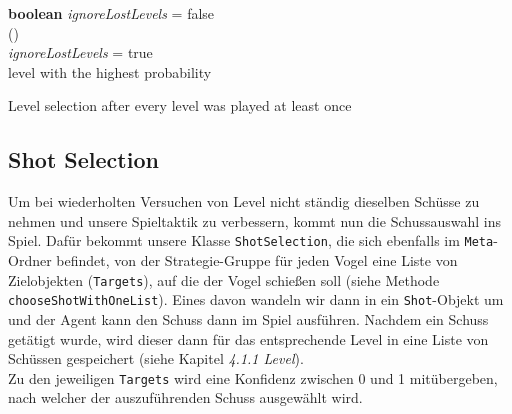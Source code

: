 \begin{algorithm}[H]
  \begin{algorithmic}[1]
  	\State \textbf{boolean} \textit{ignoreLostLevels} = false
  	\\
  	\State {}() 
  	\\
  		 		\hspace{\algorithmicindent}  \Return {} 
			\Else  
				\State \textit{ignoreLostLevels} = true
  		 	\EndIf
  		\Else
  			\Return {}
  		\EndIf
  	\EndIf
  	\\
		\Return level with the highest probability  	
  	\EndIf
  \end{algorithmic}
  \caption{Level selection after every level was played at least once \label{lvlSelec}}
\end{algorithm}

\subsection{Shot Selection}
Um bei wiederholten Versuchen von Level nicht ständig dieselben Schüsse zu nehmen und unsere Spieltaktik zu verbessern, kommt nun die Schussauswahl ins Spiel. Dafür bekommt unsere Klasse \texttt{ShotSelection}, die sich ebenfalls im \texttt{Meta}-Ordner befindet, von der Strategie-Gruppe für jeden Vogel eine Liste von Zielobjekten (\texttt{Targets}), auf die der Vogel schießen soll (siehe Methode \texttt{chooseShotWithOneList}). Eines davon wandeln wir dann in ein \texttt{Shot}-Objekt um und der Agent kann den Schuss dann im Spiel ausführen. Nachdem ein Schuss getätigt wurde, wird dieser dann für das entsprechende Level in eine Liste von Schüssen gespeichert (siehe Kapitel \textit{4.1.1 Level}).\\
Zu den jeweiligen \texttt{Targets} wird eine Konfidenz zwischen 0 und 1 mitübergeben, nach welcher der auszuführenden Schuss ausgewählt wird. 

